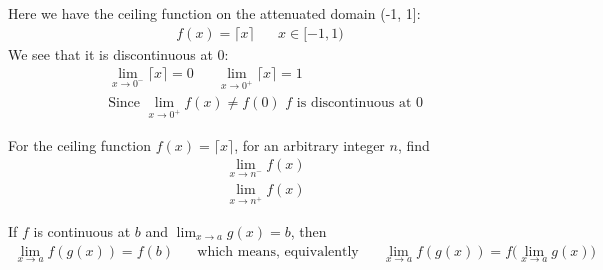 \begin{example}
Here we have the ceiling function on the attenuated domain (-1, 1]:
\begin{align*}
    f(x) = \lceil x \rceil \hspace{20pt} x \in [-1, 1)
\end{align*}
We see that it is discontinuous at $0$:
\begin{align*}
    &\lim_{x \longrightarrow 0^{-}} \lceil x \rceil = 0 \hspace{20pt} \lim_{x \longrightarrow 0^{+}} \lceil x \rceil = 1\\[2ex]
    &\text{Since} \hspace{4pt} \lim_{x \longrightarrow 0^{+}}f(x) \neq f(0) \hspace{4pt} f \hspace{4pt} \text{is discontinuous at} \hspace{4pt} 0
\end{align*}

\resizebox{30em}{30em}{%
\begin{tikzpicture}[scale=\textwidth/4.2cm]
    \node at (0.6, 1.2) {$f(x)=\lceil x \rceil, \hspace{4pt} x \in (-1, 1]$};
    \draw (-1, 0) -- (1, 0)
        node[right] {$x$};
    \draw (0, 0) -- (0, 1.3)
        node[above] {$f(x)$};
    \draw[blue, very thick] plot[smooth] file {continuity_of_functions/python_generated_tables/ceiling_neg1_1_piece_0.table};
    \draw[blue, very thick] plot[smooth] file {continuity_of_functions/python_generated_tables/ceiling_neg1_1_piece_1.table};
    \draw[blue, fill=red] (0,0) circle (.25mm);
    \draw[blue, fill=red] (1,1) circle (.25mm);
    \draw[blue, fill=white] (-1,0) circle (.25mm);
    \draw[blue, fill=white] (0,1) circle (.25mm);
    \node at (-1, -0.1) {-1};
    \node at (0, -0.1) {0};
    \node at (1, -0.1) {1};
\end{tikzpicture}
}
\end{example}

\begin{exercise}
For the ceiling function $f(x) = \lceil x \rceil$, for an arbitrary integer $n$, find
\begin{align*}
    &\lim_{x \longrightarrow n^{-}} f(x)\\
    &\lim_{x \longrightarrow n^{+}} f(x)
\end{align*}
\end{exercise}

\begin{theorem}
If $f$ is continuous at $b$ and $\lim_{x \longrightarrow a} g(x) = b$, then
\begin{align*}
    \lim_{x \longrightarrow a} f(g(x)) = f(b) \hspace{20pt} \text{which means, equivalently} \hspace{20pt} \lim_{x \longrightarrow a} f(g(x)) = f\Big(\lim_{x \longrightarrow a} g(x) \Big)
\end{align*}
\label{limit_passes_function}
\end{theorem}

